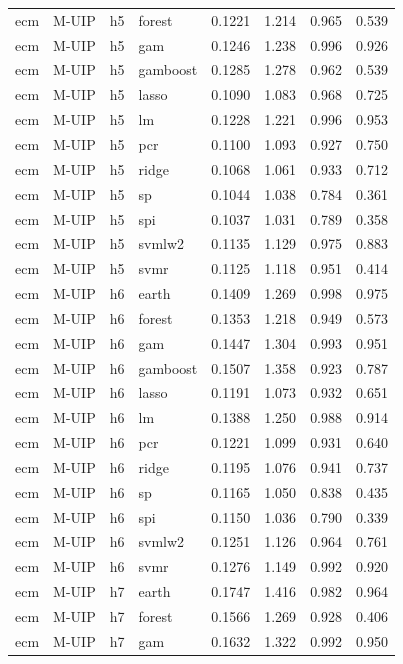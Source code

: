 \begin{ThreePartTable}
\begin{longtable}[t]{llclcccc}
ecm & M-UIP & h5 & forest & 0.1221 & 1.214 & 0.965 & 0.539\\
ecm & M-UIP & h5 & gam & 0.1246 & 1.238 & 0.996 & 0.926\\
ecm & M-UIP & h5 & gamboost & 0.1285 & 1.278 & 0.962 & 0.539\\
ecm & M-UIP & h5 & lasso & 0.1090 & 1.083 & 0.968 & 0.725\\
ecm & M-UIP & h5 & lm & 0.1228 & 1.221 & 0.996 & 0.953\\
ecm & M-UIP & h5 & pcr & 0.1100 & 1.093 & 0.927 & 0.750\\
ecm & M-UIP & h5 & ridge & 0.1068 & 1.061 & 0.933 & 0.712\\
ecm & M-UIP & h5 & sp & 0.1044 & 1.038 & 0.784 & 0.361\\
ecm & M-UIP & h5 & spi & 0.1037 & 1.031 & 0.789 & 0.358\\
ecm & M-UIP & h5 & svmlw2 & 0.1135 & 1.129 & 0.975 & 0.883\\
ecm & M-UIP & h5 & svmr & 0.1125 & 1.118 & 0.951 & 0.414\\
\addlinespace
ecm & M-UIP & h6 & earth & 0.1409 & 1.269 & 0.998 & 0.975\\
ecm & M-UIP & h6 & forest & 0.1353 & 1.218 & 0.949 & 0.573\\
ecm & M-UIP & h6 & gam & 0.1447 & 1.304 & 0.993 & 0.951\\
ecm & M-UIP & h6 & gamboost & 0.1507 & 1.358 & 0.923 & 0.787\\
ecm & M-UIP & h6 & lasso & 0.1191 & 1.073 & 0.932 & 0.651\\
ecm & M-UIP & h6 & lm & 0.1388 & 1.250 & 0.988 & 0.914\\
ecm & M-UIP & h6 & pcr & 0.1221 & 1.099 & 0.931 & 0.640\\
ecm & M-UIP & h6 & ridge & 0.1195 & 1.076 & 0.941 & 0.737\\
ecm & M-UIP & h6 & sp & 0.1165 & 1.050 & 0.838 & 0.435\\
ecm & M-UIP & h6 & spi & 0.1150 & 1.036 & 0.790 & 0.339\\
ecm & M-UIP & h6 & svmlw2 & 0.1251 & 1.126 & 0.964 & 0.761\\
ecm & M-UIP & h6 & svmr & 0.1276 & 1.149 & 0.992 & 0.920\\
\addlinespace
ecm & M-UIP & h7 & earth & 0.1747 & 1.416 & 0.982 & 0.964\\
ecm & M-UIP & h7 & forest & 0.1566 & 1.269 & 0.928 & 0.406\\
ecm & M-UIP & h7 & gam & 0.1632 & 1.322 & 0.992 & 0.950\\

\end{longtable}
\end{ThreePartTable}
